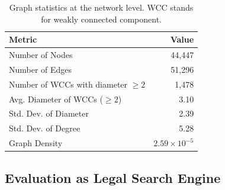 \documentclass[11pt]{article}
\begin{document}
\begin{table}[tb]
  \centering
  \caption{Graph statistics at the network level. WCC stands for weakly connected component.}
  \label{tab:network-stats}
  \begin{tabular}{p{6.5cm} r}
    \hline
    Metric & Value \\
    \hline
    Number of Nodes & 44,447 \\
    Number of Edges & 51,296 \\
    Number of WCCs with diameter $\geq 2$ & 1,478 \\
    Avg. Diameter of WCCs ($\geq 2$) & 3.10 \\
    Std. Dev. of Diameter & 2.39 \\
    Std. Dev. of Degree & 5.28 \\
    Graph Density & $2.59 \times 10^{-5}$ \\
    \hline
  \end{tabular}
\end{table}


















\subsection{Evaluation as Legal Search Engine}
\label{sec:evaluation-search}
\end{document}
